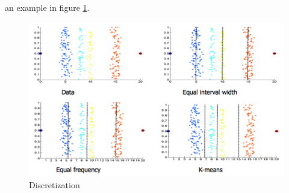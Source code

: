 \documentclass[12pt]{article}
\begin{document}
an example in figure \ref{fig:discretization}.
\begin{figure}[h!]
  \includegraphics[width=\linewidth]{images/discretization.png}
  \caption{Discretization}
  \label{fig:discretization}
\end{figure}
\end{document}
